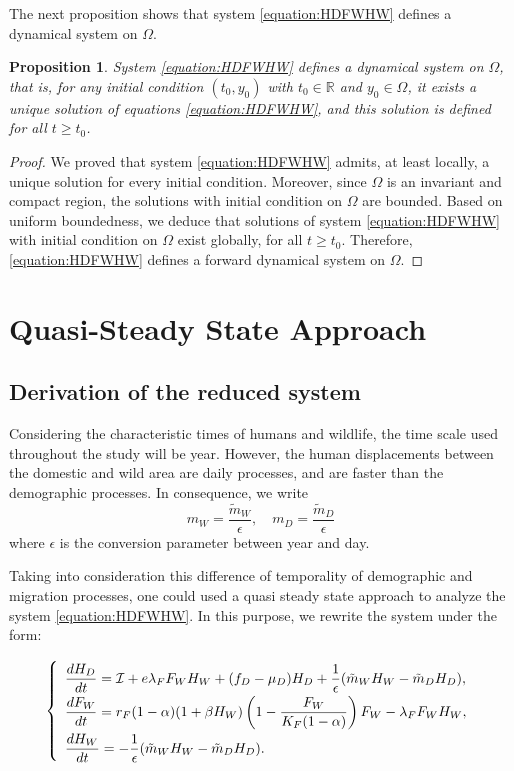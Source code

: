 \documentclass{article}
\newcommand{\lfw}{\lambda_{F}}
\newcommand{\lfw}{\lambda_{F}}
\newcommand{\cI}{\mathcal{I}}
\newcommand{\mW}{\tilde{m}_W}
\newcommand{\mD}{\tilde{m}_D}
\newtheorem{prop}[theorem]{Proposition}
\theoremstyle{definition}
\theoremstyle{remark}
\begin{document}
The next proposition shows that system \eqref{equation:HDFWHW} defines a dynamical system on $\Omega$.

\begin{prop}
System \eqref{equation:HDFWHW} defines a dynamical system on $\Omega$, that is, for any initial condition $(t_0, y_0)$ with $t_0 \in \mathbb{R}$ and $y_0 \in \Omega$, it exists a unique solution of equations \eqref{equation:HDFWHW}, and this solution is defined for all $t \geq t_0$.
\end{prop}

\begin{proof}
We proved that system \eqref{equation:HDFWHW} admits, at least locally, a unique solution for every initial condition. Moreover, since $\Omega$ is an invariant and compact region, the solutions with initial condition on $\Omega$ are bounded. Based on uniform boundedness, we deduce that solutions of system \eqref{equation:HDFWHW} with initial condition on $\Omega$ exist globally, for all $t\geq t_0$. Therefore, \eqref{equation:HDFWHW} defines a forward dynamical system on $\Omega$.
\end{proof}

\section{Quasi-Steady State Approach} \label{sec:qssa}
\subsection{Derivation of the reduced system}

Considering the characteristic times of humans and wildlife, the time scale used throughout the study will be year. However, the human displacements between the domestic and wild area are daily processes, and are faster than the demographic processes. In consequence, we write $$m_W = \dfrac{\mW}{\epsilon}, \quad m_D = \dfrac{\mD}{\epsilon}$$ where $\epsilon$ is the conversion parameter between year and day. 

Taking into consideration this difference of temporality of demographic and migration processes, one could used a quasi steady state approach to analyze the system \eqref{equation:HDFWHW}. In this purpose, we rewrite the system under the form:

\begin{equation}
\def\arraystretch{2}
\left\{ 
\begin{array}{l}
\dfrac{dH_D}{dt}= \cI + e\lfw F_WH_W + (f_D - \mu_D) H_D + \dfrac{1}{\epsilon}(\mW H_W - \mD H_D), \\
\dfrac{dF_W}{dt} = r_F(1- \alpha) (1+ \beta H_W) \left(1 - \dfrac{F_W}{K_F(1-\alpha)} \right) F_W - \lfw F_WH_W, \\
\dfrac{dH_W}{dt}= - \dfrac{1}{\epsilon}(\mW H_W - \mD H_D).
\end{array} \right.
\label{equation:HDFWHW, fast}
\end{equation}
\end{document}
